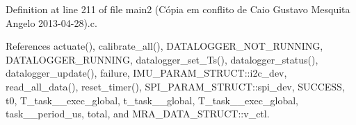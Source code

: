Definition at line 211 of file main2 (\-Cópia em conflito de Caio Gustavo Mesquita Angelo 2013-\/04-\/28).\-c.



References actuate(), calibrate\-\_\-all(), D\-A\-T\-A\-L\-O\-G\-G\-E\-R\-\_\-\-N\-O\-T\-\_\-\-R\-U\-N\-N\-I\-N\-G, D\-A\-T\-A\-L\-O\-G\-G\-E\-R\-\_\-\-R\-U\-N\-N\-I\-N\-G, datalogger\-\_\-set\-\_\-\-Ts(), datalogger\-\_\-status(), datalogger\-\_\-update(), failure, I\-M\-U\-\_\-\-P\-A\-R\-A\-M\-\_\-\-S\-T\-R\-U\-C\-T\-::i2c\-\_\-dev, read\-\_\-all\-\_\-data(), reset\-\_\-timer(), S\-P\-I\-\_\-\-P\-A\-R\-A\-M\-\_\-\-S\-T\-R\-U\-C\-T\-::spi\-\_\-dev, S\-U\-C\-C\-E\-S\-S, t0, T\-\_\-task\-\_\-\_\-exec\-\_\-global, t\-\_\-task\-\_\-\_\-global, T\-\_\-task\-\_\-\_\-exec\-\_\-global, task\-\_\-\_\-period\-\_\-us, total, and M\-R\-A\-\_\-\-D\-A\-T\-A\-\_\-\-S\-T\-R\-U\-C\-T\-::v\-\_\-ctl.


